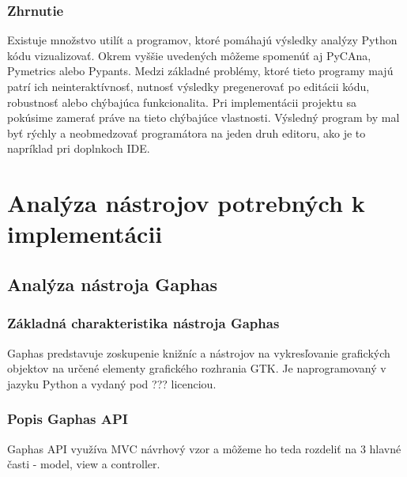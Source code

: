 \documentclass[11pt,oneside,final]{fithesis2}
\begin{document}
	\subsection{Zhrnutie}
	
	Existuje množstvo utilít a programov, ktoré pomáhajú výsledky analýzy Python kódu vizualizovať. Okrem vyššie uvedených môžeme spomenúť aj PyCAna, Pymetrics alebo Pypants. Medzi základné problémy, ktoré tieto programy majú patrí ich neinteraktívnosť, nutnosť výsledky pregenerovať po editácii kódu, robustnosť alebo chýbajúca funkcionalita. Pri implementácii projektu sa pokúsime zamerať práve na tieto chýbajúce vlastnosti. Výsledný program by mal byť rýchly a neobmedzovať programátora na jeden druh editoru, ako je to napríklad pri doplnkoch IDE.
	
    
\chapter{Analýza nástrojov potrebných k implementácii}

	\section{Analýza nástroja Gaphas}

	\subsection{Základná charakteristika nástroja Gaphas}

		Gaphas predstavuje zoskupenie knižníc a nástrojov na vykresľovanie grafických objektov na určené elementy grafického rozhrania GTK. Je naprogramovaný v jazyku Python a vydaný pod ??? licenciou.

	\subsection{Popis Gaphas API}

Gaphas API využíva MVC návrhový vzor a môžeme ho teda rozdeliť na 3 hlavné časti - model, view a controller.
\end{document}
